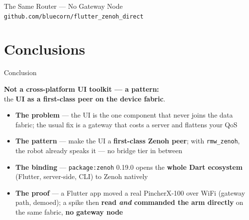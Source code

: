\documentclass[9pt]{beamer}
\begin{document}
\begin{frame}{The Same Router --- No Gateway Node}
  \vspace{0.25em}
  {\small\textcolor{m3LightPrimary}{\texttt{github.com/bluecorn/flutter\_zenoh\_direct}}}
\end{frame}

\section{Conclusions}

\begin{frame}{Conclusion}
  \begin{center}
    \textbf{Not a cross-platform UI toolkit --- a pattern:}\\[0.2em]
    {\large the \textbf{UI as a first-class peer on the device fabric}.}
  \end{center}

  \vspace{0.5em}
  \begin{itemize}
    \item \textbf{The problem} --- the UI is the one component that never joins the data fabric; the usual fix is a gateway that costs a server and flattens your QoS
    \item \textbf{The pattern} --- make the UI a \textbf{first-class Zenoh peer}; with \texttt{rmw\_zenoh}, the robot already speaks it --- no bridge tier in between
    \item \textbf{The binding} --- \texttt{package:zenoh} 0.19.0 opens the \textbf{whole Dart ecosystem} (Flutter, server-side, CLI) to Zenoh natively
    \item \textbf{The proof} --- a Flutter app moved a real PincherX-100 over WiFi (gateway path, demoed); a spike then \textbf{read \emph{and} commanded the arm directly} on the same fabric, \textbf{no gateway node}
  \end{itemize}
\end{frame}
\end{document}
